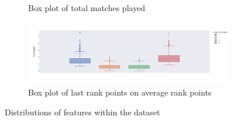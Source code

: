 \begin{figure}[h]
\begin{subfigure}[b]{0.48\textwidth}
		\caption{Box plot of total matches played}
		\label{fig:kmeans_box_plot_matches_played}
  \end{subfigure}
	\begin{subfigure}[b]{0.48\textwidth}
		\includegraphics[width=\textwidth]{plots/kmeans/kmeans-box-plot-lrponavgrp.png}
		\caption{Box plot of last rank points on average rank points}
		\label{fig:kmeans_box_plot_lrponavgrp}
	\end{subfigure}
	\caption{Distributions of features within the dataset}
	\label{fig:kmeans_distributions}
\end{figure}

